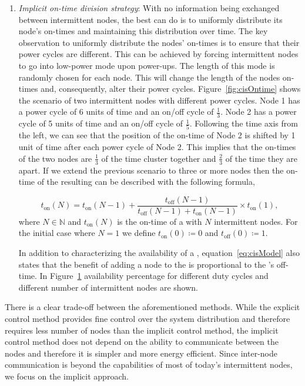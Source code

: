 \begin{enumerate}[label=\roman*.]
\begin{figure}
		\label{fig:cisModel}
\end{figure} 
%
		\item \textit{Implicit on-time division strategy}: With no information being exchanged between intermittent nodes, the best \sys can do is to uniformly distribute its node's on-times and maintaining this distribution over time. The key observation to uniformly distribute the nodes' on-times is to ensure that their power cycles are different. This can be achieved by forcing intermittent nodes to go into low-power mode upon power-ups. The length of this mode is randomly chosen for each node. This will change the length of the nodes on-times and, consequently, alter their power cycles. Figure~\ref{fig:cisOntime} shows the scenario of two intermittent nodes with different power cycles. Node 1 has a power cycle of 6 units of time and an on/off cycle of $\frac{1}{3}$. Node 2 has a power cycle of 5 units of time and an on/off cycle of $\frac{1}{5}$. Following the time axis from the left, we can see that the position of the on-time of Node 2 is shifted by 1 unit of time after each power cycle of Node 2. This implies that the on-times of the two nodes are $\frac{1}{3}$ of the time cluster together and $\frac{2}{3}$ of the time they are apart. If we extend the previous scenario to three or more nodes then the on-time of the resulting \sys can be described with the following formula,
				
\begin{equation}
	t_\text{on}(N) = t_\text{on}(N-1) + \frac{t_\text{off}(N-1)}{t_\text{off}(N-1)+t_\text{on}(N-1)} \times t_\text{on}(1),
		\label{eq:cisModel}
\end{equation}
where $N \in \mathbb{N}$ and  $t_\text{on}(N)$ is the on-time of a \sys with $N$ intermittent nodes. For the initial case where $N=1$ we define $t_\text{on}(0)\coloneqq 0$ and $t_\text{off}(0) \coloneqq 1$.
				
In addition to characterizing the availability of a \sys, equation~\ref{eq:cisModel} also states that the benefit of adding a node to the \sys is proportional to the \sys's off-time. In Figure~\ref{fig:cisModel} \sys availability percentage for different duty cycles and different number of intermittent nodes are shown.
\end{enumerate}
There is a clear trade-off between the aforementioned methods. While the explicit control method provides fine control over the system 
distribution and therefore requires less number of nodes than the implicit control method, the implicit control method does not depend on the ability to communicate between the nodes and therefore it is simpler and more energy efficient. Since inter-node communication is beyond the capabilities of most of today's intermittent nodes, we focus on the implicit approach.
 
